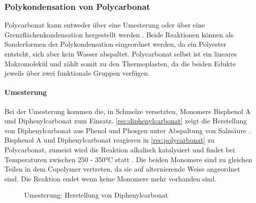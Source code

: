 \subsubsection{Polykondensation von Polycarbonat}

Polycarbonat kann entweder über eine Umesterung oder über eine
Grenzflächenkondensation hergestellt werden \cite{cuzpe}. Beide Reaktionen
können als Sonderformen der Polykondensation eingeordnet werden, da ein
Polyester entsteht, sich aber kein Wasser abspaltet. Polycarbonat selbst ist ein
lineares Makromolekül und zählt somit zu den Thermoplasten, da die beiden Edukte
jeweils über zwei funktionale Gruppen verfügen.

\paragraph{Umesterung} Bei der Umesterung kommen die, in Schmelze versetzten,
Monomere Bisphenol A und Diphenylcarbonat zum Einsatz.
\autoref{rec:diphenylcarbonat} zeigt die Herstellung von Diphenylcarbonat aus
Phenol und Phosgen unter Abspaltung von Salzsäure \cite{cuzpe}. Bisphenol A und
Diphenylcarbonat reagieren in \autoref{rec:polycarbonat} zu Polycarbonat,
zumeist wird die Reaktion alkalisch katalysiert und findet bei Temperaturen
zwischen 250 - 350°C statt \cite{pop}. Die beiden Monomere sind zu gleichen
Teilen in dem Copolymer vertreten, da sie auf alternierende Weise angeordnet
sind. Die Reaktion endet wenn keine Monomere mehr vorhanden sind.

\begin{figure}[H]
    \begin{center}
        \footnotesize
        \setatomsep{1.7em}

        \chemsign{+}
        \chemrel{->}
        \chemsign{+}

        \caption{Umesterung: Herstellung von Diphenylcarbonat}
        \label{rec:diphenylcarbonat}
    \end{center}
\end{figure}

